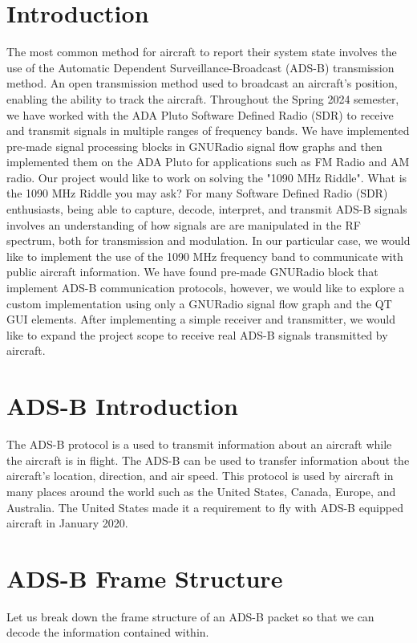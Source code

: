 \documentclass[conference, onecolumn]{IEEEtran}
\begin{document}
\section{Introduction}
The most common method for aircraft to report their system state involves the use of the Automatic Dependent Surveillance-Broadcast (ADS-B) transmission method. An open transmission method used to broadcast an aircraft's position, enabling the ability to track the aircraft. Throughout the Spring 2024 semester, we have worked with the ADA Pluto Software Defined Radio (SDR) to receive and transmit signals in multiple ranges of frequency bands. We have implemented pre-made signal processing blocks in GNURadio signal flow graphs and then implemented them on the ADA Pluto for applications such as FM Radio and AM radio. Our project would like to work on solving the "1090 MHz Riddle". What is the 1090 MHz Riddle you may ask? For many Software Defined Radio (SDR) enthusiasts, being able to capture, decode, interpret, and transmit ADS-B signals involves an understanding of how signals are are manipulated in the RF spectrum, both for transmission and modulation. In our particular case, we would like to implement the use of the 1090 MHz frequency band to communicate with public aircraft information. We have found pre-made GNURadio block that implement ADS-B communication protocols, however, we would like to explore a custom implementation using only a GNURadio signal flow graph and the QT GUI elements. After implementing a simple receiver and transmitter, we would like to expand the project scope to receive real ADS-B signals transmitted by aircraft.

\section{ADS-B Introduction}
The ADS-B protocol is a used to transmit information about an aircraft while the aircraft is in flight. The ADS-B can be used to transfer information about the aircraft's location, direction, and air speed. This protocol is used by aircraft in many places around the world such as the United States, Canada, Europe, and Australia. The United States made it a requirement to fly with ADS-B equipped aircraft in January 2020. 

\section{ADS-B Frame Structure}
Let us break down the frame structure of an ADS-B packet so that we can decode the information contained within. 
\end{document}

